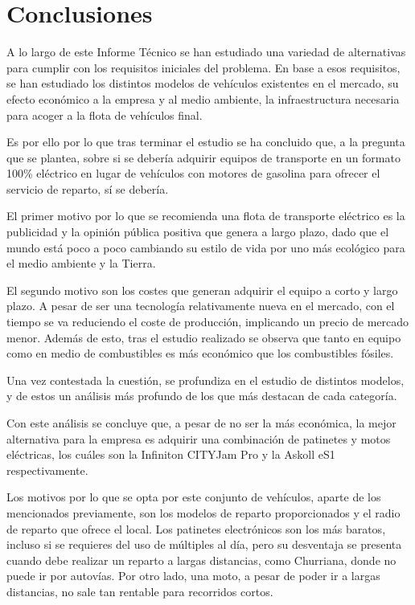 \newpage
{}
\section*{Conclusiones}
\label{conclusiones}

A lo largo de este Informe Técnico se han estudiado una variedad de alternativas para cumplir con los requisitos iniciales del problema. En base a esos requisitos, se han estudiado los distintos modelos de vehículos existentes en el mercado, su efecto económico a la empresa y al medio ambiente, la infraestructura necesaria para acoger a la flota de vehículos final.

Es por ello por lo que tras terminar el estudio se ha concluido que, a la pregunta que se plantea, sobre si se debería adquirir equipos de transporte en un formato 100\% eléctrico en lugar de vehículos con motores de gasolina para ofrecer el servicio de reparto, sí se debería.

El primer motivo por lo que se recomienda una flota de transporte eléctrico es la publicidad y la opinión pública positiva que genera a largo plazo, dado que el mundo está poco a poco cambiando su estilo de vida por uno más ecológico para el medio ambiente y la Tierra.

El segundo motivo son los costes que generan adquirir el equipo a corto y largo plazo. A pesar de ser una tecnología relativamente nueva en el mercado, con el tiempo se va reduciendo el coste de producción, implicando un precio de mercado menor. Además de esto, tras el estudio realizado se observa que tanto en equipo como en medio de combustibles es más económico que los combustibles fósiles.

Una vez contestada la cuestión, se profundiza en el estudio de distintos modelos, y de estos un análisis más profundo de los que más destacan de cada categoría.

Con este análisis se concluye que, a pesar de no ser la más económica, la mejor alternativa para la empresa es adquirir una combinación de patinetes y motos eléctricas, los cuáles son la Infiniton CITYJam Pro y la Askoll eS1 respectivamente.

Los motivos por lo que se opta por este conjunto de vehículos, aparte de los mencionados previamente, son los modelos de reparto proporcionados y el radio de reparto que ofrece el local. Los patinetes electrónicos son los más baratos, incluso si se requieres del uso de múltiples al día, pero su desventaja se presenta cuando debe realizar un reparto a largas distancias, como Churriana, donde no puede ir por autovías. Por otro lado, una moto, a pesar de poder ir a largas distancias, no sale tan rentable para recorridos cortos.

